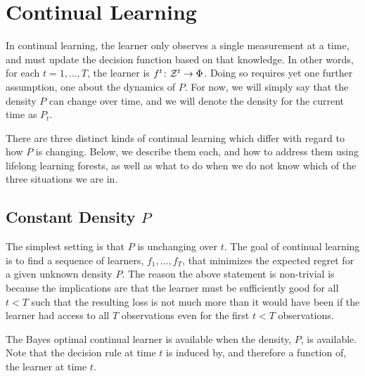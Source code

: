 \documentclass{article}
\begin{document}



\clearpage 
\section{Continual Learning}
\label{sec:continual}

In continual learning, the learner only observes a single measurement at a time, and must update the decision function based on that knowledge.  In other words, for each $t = 1,\ldots, T$, the learner is $f^t {\colon} \mathcal{Z}^t \to \Phi$.  
Doing so requires yet one further assumption, one about the dynamics of $P$.  For now, we will simply say that the density $P$ can change over time, and we will denote the density for the current time as $P_t$.  


There are three distinct kinds of continual learning which differ with regard to how $P$ is changing. Below, we describe them each, and how to address them using lifelong learning forests, as well as what to do when we do not know which of the three situations we are in. 

\subsection{Constant Density $P$}
\label{sec:constant}

The simplest setting is that $P$ is unchanging over $t$.  
The goal of continual learning is to find a sequence of learners, $f_1, \ldots, f_T$, that minimizes the expected regret for a given unknown density $P$.  The reason the above statement is non-trivial is because the implications are that the learner must be sufficiently good for all $t<T$ such that the resulting loss is not much more than it would have been if the learner had access to all $T$ observations even for the first $t<T$ observations.


The Bayes optimal continual learner is available when the density, $P$, is available. Note that the decision rule at time $t$ is induced by, and therefore a function of, the learner at time $t$. 

\end{document}

